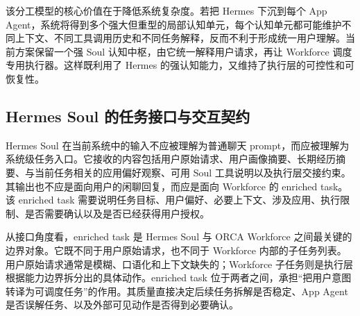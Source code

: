 该分工模型的核心价值在于降低系统复杂度。若把 Hermes 下沉到每个 App Agent，系统将得到多个强大但重型的局部认知单元，每个认知单元都可能维护不同上下文、不同工具调用历史和不同任务解释，反而不利于形成统一用户理解。当前方案保留一个强 Soul 认知中枢，由它统一解释用户请求，再让 Workforce 调度专用执行器。这样既利用了 Hermes 的强认知能力，又维持了执行层的可控性和可恢复性。

\subsection{Hermes Soul 的任务接口与交互契约}

Hermes Soul 在当前系统中的输入不应被理解为普通聊天 prompt，而应被理解为系统级任务入口。它接收的内容包括用户原始请求、用户画像摘要、长期经历摘要、与当前任务相关的应用偏好观察、可用 Soul 工具说明以及执行层交接约束。其输出也不应是面向用户的闲聊回复，而应是面向 Workforce 的 enriched task。该 enriched task 需要说明任务目标、用户偏好、必要上下文、涉及应用、执行限制、是否需要确认以及是否已经获得用户授权。

从接口角度看，enriched task 是 Hermes Soul 与 ORCA Workforce 之间最关键的边界对象。它既不同于用户原始请求，也不同于 Workforce 内部的子任务列表。用户原始请求通常是模糊、口语化和上下文缺失的；Workforce 子任务则是执行层根据能力边界拆分出的具体动作。enriched task 位于两者之间，承担“把用户意图转译为可调度任务”的作用。其质量直接决定后续任务拆解是否稳定、App Agent 是否误解任务、以及外部可见动作是否得到必要确认。

